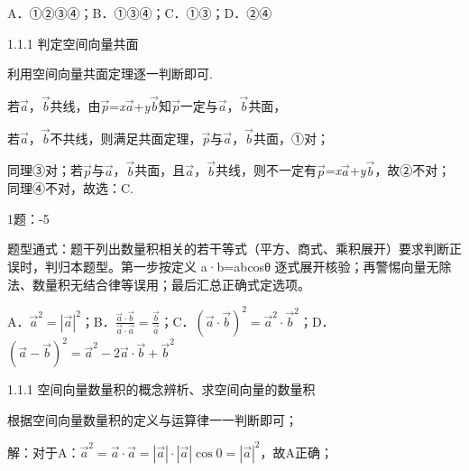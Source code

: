 A．①②③④；B．①③④；C．①③；D．②④

\noindent{}\quad{}1.1.1 判定空间向量共面

利用空间向量共面定理逐一判断即可.

若\(\overrightarrow{a}\)，\(\overrightarrow{b}\)共线，由\(\overrightarrow{p}\)=\emph{x}\(\overrightarrow{a}\)+\emph{y}\(\overrightarrow{b}\)知\(\overrightarrow{p}\)一定与\(\overrightarrow{a}\)，\(\overrightarrow{b}\)共面，

若\(\overrightarrow{a}\)，\(\overrightarrow{b}\)不共线，则满足共面定理，\(\overrightarrow{p}\)与\(\overrightarrow{a}\)，\(\overrightarrow{b}\)共面，①对；

同理③对；若\(\overrightarrow{p}\)与\(\overrightarrow{a}\)，\(\overrightarrow{b}\)共面，且\(\overrightarrow{a}\)，\(\overrightarrow{b}\)共线，则不一定有\(\overrightarrow{p}\)=\emph{x}\(\overrightarrow{a}\)+\emph{y}\(\overrightarrow{b}\)，故②不对；同理④不对，故选：C.


1题：-5

题型通式：题干列出数量积相关的若干等式（平方、商式、乘积展开）要求判断正误时，判归本题型。第一步按定义
a·b=\textbar a\textbar\textbar b\textbar cosθ
逐式展开核验；再警惕向量无除法、数量积无结合律等误用；最后汇总正确式定选项。


A．\({\overrightarrow{a}}^{2} = \left| \overrightarrow{a} \right|^{2}\)；B．\(\frac{\overrightarrow{a} \cdot \overrightarrow{b}}{\overrightarrow{a} \cdot \overrightarrow{a}} = \frac{\overrightarrow{b}}{\overrightarrow{a}}\)；C．\(\left( \overrightarrow{a} \cdot \overrightarrow{b} \right)^{2} = {\overrightarrow{a}}^{2} \cdot {\overrightarrow{b}}^{2}\)；D．\(\left( \overrightarrow{a} - \overrightarrow{b} \right)^{2} = {\overrightarrow{a}}^{2} - 2\overrightarrow{a} \cdot \overrightarrow{b} + {\overrightarrow{b}}^{2}\)

\noindent{}\quad{}1.1.1 空间向量数量积的概念辨析、求空间向量的数量积

根据空间向量数量积的定义与运算律一一判断即可；

解：对于A：\({\overrightarrow{a}}^{2} = \overrightarrow{a} \cdot \overrightarrow{a} = \left| \overrightarrow{a} \right| \cdot \left| \overrightarrow{a} \right|\cos 0 = \left| \overrightarrow{a} \right|^{2}\)，故A正确；


